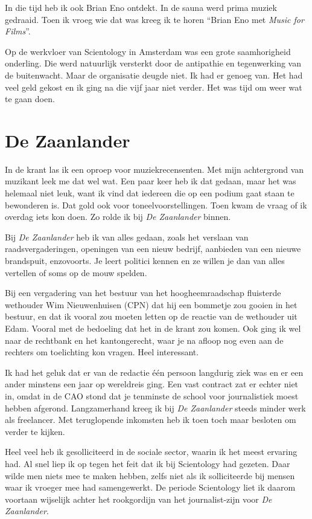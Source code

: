 \documentclass[10pt,twoside, openright]{memoir}
\begin{document}
In die tijd heb ik ook Brian Eno ontdekt. In de sauna werd prima muziek gedraaid. Toen ik vroeg wie dat was kreeg ik te horen ``Brian Eno met \emph{Music for Films}''.

Op de werkvloer van Scientology in Amsterdam was een grote saamhorigheid onderling. Die werd natuurlijk versterkt door de antipathie en tegenwerking van de buitenwacht. Maar de organisatie deugde niet. Ik had er genoeg van. Het had veel geld gekost en ik ging na die vijf jaar niet verder. Het was tijd om weer wat te gaan doen.

\chapter{De Zaanlander} %
\label{cha:zaanlander}

In de krant las ik een oproep voor muziekrecensenten. Met mijn achtergrond van muzikant leek me dat wel wat. Een paar keer heb ik dat gedaan, maar het was helemaal niet leuk, want ik vind dat iedereen die op een podium gaat staan te bewonderen is. Dat gold ook voor toneelvoorstellingen. Toen kwam de vraag of ik overdag iets kon doen. Zo rolde ik bij \emph{De Zaanlander} binnen. 

Bij \emph{De Zaanlander} heb ik van alles gedaan, zoals het verslaan van raadsvergaderingen, openingen van een nieuw bedrijf, aanbieden van een nieuwe brandspuit, enzovoorts. Je leert politici kennen en ze willen je dan van alles vertellen of soms op de mouw spelden. 

Bij een vergadering van het bestuur van het hoogheemraadschap fluisterde wethouder Wim Nieuwenhuisen (CPN) dat hij een bommetje zou gooien in het bestuur, en dat ik vooral zou moeten letten op de reactie van de wethouder uit Edam. Vooral met de bedoeling dat het in de krant zou komen. Ook ging ik wel naar de rechtbank en het kantongerecht, waar je na afloop nog even aan de rechters om toelichting kon vragen. Heel interessant. 

Ik had het geluk dat er van de redactie één persoon langdurig ziek was en er een ander minstens een jaar op wereldreis ging. Een vast contract zat er echter niet in, omdat in de CAO stond dat je tenminste de school voor journalistiek moest hebben afgerond. Langzamerhand kreeg ik bij \emph{De Zaanlander} steeds minder werk als freelancer. Met teruglopende inkomsten heb ik toen toch maar besloten om verder te kijken.

Heel veel heb ik gesolliciteerd in de sociale sector, waarin ik het meest ervaring had. Al snel liep ik op tegen het feit dat ik bij Scientology had gezeten. Daar wilde men niets mee te maken hebben, zelfs niet als ik solliciteerde bij mensen waar ik vroeger mee had samengewerkt. De periode Scientology liet ik daarom voortaan wijselijk achter het rookgordijn van het journalist-zijn voor \emph{De Zaanlander}.
\end{document}
